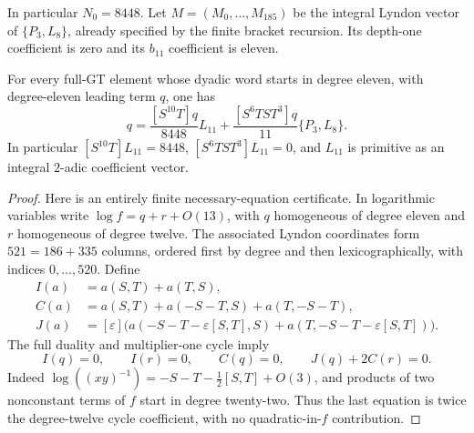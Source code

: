 In particular $N_0=8448$. Let
$M=(M_0,\ldots,M_{185})$ be the integral Lyndon vector of
$\{P_3,L_8\}$, already specified by the finite bracket recursion.
Its depth-one coefficient is zero and its $b_{11}$ coefficient
is eleven.

\begin{lemma}\label{lem:fr-pure-eleven-certificate}
For every full-GT element whose dyadic word starts in degree
eleven, with degree-eleven leading term $q$, one has
\[
 q=\frac{[S^{10}T]q}{8448}L_{11}
       +\frac{[S^6TST^3]q}{11}\{P_3,L_8\}.
\]
In particular $[S^{10}T]L_{11}=8448$,
$[S^6TST^3]L_{11}=0$, and $L_{11}$ is primitive as an
integral $2$-adic coefficient vector.
\end{lemma}

\begin{proof}
Here is an entirely finite necessary-equation certificate.
In logarithmic variables write
$\log f=q+r+O(13)$, with $q$ homogeneous of degree eleven
and $r$ homogeneous of degree twelve. The associated Lyndon
coordinates form $521=186+335$ columns, ordered first by degree
and then lexicographically, with indices $0,\ldots,520$.
Define
\[
 \begin{split}
 I(a)&=a(S,T)+a(T,S),\\
 C(a)&=a(S,T)+a(-S-T,S)+a(T,-S-T),\\
 J(a)&=[\varepsilon]\bigl(a(-S-T-\varepsilon[S,T],S)
                 +a(T,-S-T-\varepsilon[S,T])\bigr).
 \end{split}
\]
The full duality and multiplier-one cycle imply
\[
 I(q)=0,\qquad I(r)=0,\qquad C(q)=0,\qquad
                         J(q)+2C(r)=0.
\]
Indeed $\log((xy)^{-1})=-S-T-\tfrac12[S,T]+O(3)$,
and products of two nonconstant terms of $f$ start in degree
twenty-two. Thus the last equation is twice the degree-twelve
cycle coefficient, with no quadratic-in-$f$ contribution.


\end{proof}
